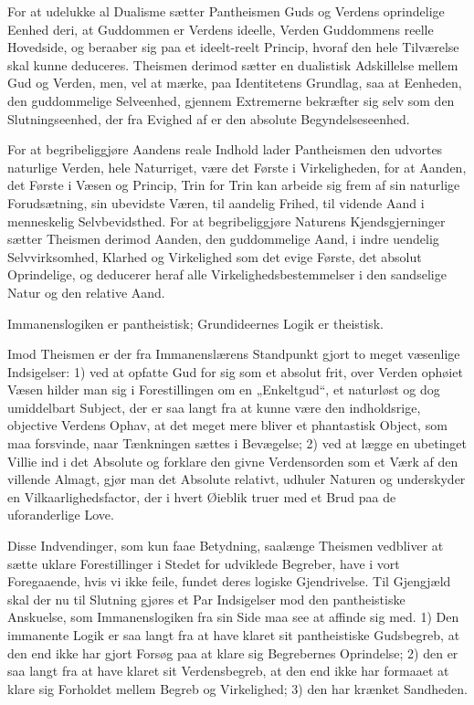 \documentclass[12pt]{book}
\newcommand{\opage}[1]{\marginnote{\footnotesize\textit{[#1]}}}
\begin{document}
For at udelukke al Dualisme sætter Pantheismen Guds og Verdens
oprindelige Eenhed deri, at Guddommen er Verdens ideelle, Verden
Guddommens reelle Hovedside, og beraaber sig paa et ideelt-reelt
Princip, hvoraf den hele Tilværelse skal kunne deduceres. Theismen
derimod sætter en
\opage{86} dualistisk Adskillelse mellem Gud og Verden, men, vel at mærke, paa
Identitetens Grundlag, saa at Eenheden, den guddommelige
Selveenhed, gjennem Extremerne bekræfter sig selv som den
Slutningseenhed, der fra Evighed af er den absolute
Begyndelseseenhed.

For at begribeliggjøre Aandens reale Indhold lader Pantheismen den
udvortes naturlige Verden, hele Naturriget, være det Første i
Virkeligheden, for at Aanden, det Første i Væsen og Princip, Trin
for Trin kan arbeide sig frem af sin naturlige Forudsætning, sin
ubevidste Væren, til aandelig Frihed, til vidende Aand i menneskelig
Selvbevidsthed. For at begribeliggjøre Naturens Kjendsgjerninger
sætter Theismen derimod Aanden, den guddommelige Aand, i indre
uendelig Selvvirksomhed, Klarhed og Virkelighed som det evige
Første, det absolut Oprindelige, og deducerer heraf alle
Virkelighedsbestemmelser i den sandselige Natur og den relative
Aand.

Immanenslogiken er pantheistisk; Grundideernes Logik er theistisk.

Imod Theismen er der fra Immanenslærens Standpunkt gjort to meget
væsenlige Indsigelser: 1) ved at opfatte Gud for sig som et absolut
frit, over Verden ophøiet Væsen hilder man sig i Forestillingen om
en „Enkeltgud“, et naturløst og dog umiddelbart Subject, der er saa
langt fra at kunne være den indholdsrige, objective Verdens Ophav,
at det meget mere bliver et phantastisk Object, som maa forsvinde,
naar Tænkningen sættes i Bevægelse; 2) ved at lægge en ubetinget
Villie ind i det Absolute og forklare den givne Verdensorden som et
Værk af den villende Almagt, gjør man det Absolute relativt, udhuler
Naturen og underskyder en Vilkaarlighedsfactor, der i hvert Øieblik
truer med et Brud paa de uforanderlige Love.

Disse Indvendinger, som kun faae Betydning, saalænge Theismen
vedbliver at sætte uklare Forestillinger i Stedet for
\opage{87} udviklede Begreber, have i vort Foregaaende, hvis vi ikke feile,
fundet deres logiske Gjendrivelse. Til Gjengjæld skal der nu til
Slutning gjøres et Par Indsigelser mod den pantheistiske Anskuelse,
som Immanenslogiken fra sin Side maa see at affinde sig med. 1) Den
immanente Logik er saa langt fra at have klaret sit pantheistiske
Gudsbegreb, at den end ikke har gjort Forsøg paa at klare sig
Begrebernes Oprindelse; 2) den er saa langt fra at have klaret sit
Verdensbegreb, at den end ikke har formaaet at klare sig Forholdet
mellem Begreb og Virkelighed; 3) den har krænket Sandheden.
\end{document}

